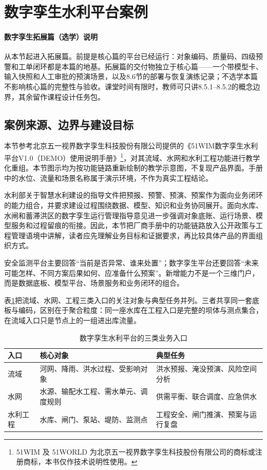 \section{数字孪生水利平台案例}\label{sec:digital-twin-case}

\begin{notebox}
\paragraph{数字孪生拓展篇（选学）说明}从本节起进入拓展篇。前提是核心篇的平台已经运行：对象编码、质量码、四级预警和工单闭环都是本篇的地基。拓展篇的交付物独立于核心篇——一个带模型卡、输入快照和人工审批的预演场景，以及8.6节的部署与恢复演练记录；不选学本篇不影响核心篇的完整性与验收。课堂时间有限时，教师可只讲8.5.1--8.5.2的概念边界，其余留作课程设计任务包。
\end{notebox}

\subsection{案例来源、边界与建设目标}

本节参考北京五一视界数字孪生科技股份有限公司提供的《51WIM数字孪生水利平台V1.0（DEMO）使用说明手册》\footnote{51WIM 及 51WORLD 为北京五一视界数字孪生科技股份有限公司的商标或注册商标，本书仅作技术说明性使用。}，对其流域、水网和水利工程功能进行教学化重组\cite{wuyi2026wim}。本节图示均为按功能链路重新绘制的教学示意图，不复现产品界面。手册中的水位、流量和场景名称属于演示环境，不作为真实工程结论。

水利部关于智慧水利建设的指导文件把预报、预警、预演、预案作为面向业务闭环的能力组合，并要求建设过程围绕数据、模型、知识和业务协同展开\cite{smartWaterGuidance2021,twinWater2023}。面向水库、水闸和蓄滞洪区的数字孪生运行管理指导意见进一步强调对象底账、运行场景、模型服务和过程留痕的衔接\cite{twinProject2024}。因此，本节把厂商手册中的功能链路放入公开政策与工程管理语境中讲解，读者应先理解业务目标和证据要求，再比较具体产品的界面组织方式。

安全监测平台主要回答“当前是否异常、谁来处置”；数字孪生平台还要回答“未来可能怎样、不同方案后果如何、应准备什么预案”。新增能力不是一个三维门户，而是数据底板、模型平台、场景服务和业务闭环的组合。

表\ref{tab:twin-three-portals}把流域、水网、工程三类入口的关注对象与典型任务并列。三者共享同一套底板与编码，区别在于聚合粒度：同一座水库在工程入口是完整的坝体与测点集合，在流域入口只是节点上的一组进出库流量。

\begin{table}[htbp]
\centering
\caption{数字孪生水利平台的三类业务入口}
\label{tab:twin-three-portals}
\begin{tabular}{p{2.5cm}p{4.4cm}p{5.5cm}}
\toprule
入口 & 核心对象 & 典型任务 \\
\midrule
流域 & 河网、降雨、洪水过程、受影响对象 & 洪水预报、淹没预演、风险空间分析 \\
水网 & 水源、输配水工程、需水单元、调度规则 & 供需平衡、联合调度、应急供水 \\
水利工程 & 水库、闸门、泵站、堤防、监测点 & 工程安全、闸门推演、预案与运行复盘 \\
\bottomrule
\end{tabular}
\end{table}

